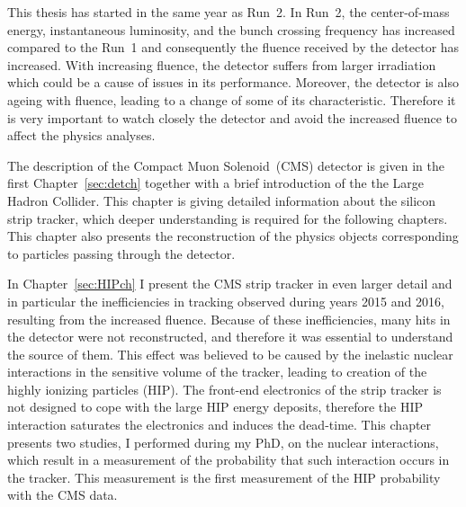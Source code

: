 

This thesis has started in the same year as Run~2. In Run~2, the center-of-mass energy, instantaneous luminosity, and the bunch crossing frequency has increased compared to the Run~1 and consequently the fluence received by the detector has increased. With increasing fluence, the detector suffers from larger irradiation which could be a cause of issues in its performance. Moreover, the detector is also ageing with fluence, leading to a change of some of its characteristic. Therefore it is very important to watch closely the detector and avoid the increased fluence to affect the physics analyses.

The description of the Compact Muon Solenoid~(CMS) detector is given in the first Chapter~\ref{sec:detch} together with a brief introduction of the the Large Hadron Collider. This chapter is giving detailed information about the silicon strip tracker, which deeper understanding is required for the following chapters. This chapter also presents the reconstruction of the physics objects corresponding to particles passing through the detector.

In Chapter~\ref{sec:HIPch} I present the CMS strip tracker in even larger detail and in particular the inefficiencies in tracking observed during years 2015 and 2016, resulting from the increased fluence. Because of these inefficiencies, many hits in the detector were not reconstructed, and therefore it was essential to understand the source of them. This effect was believed to be caused by the inelastic nuclear interactions in the sensitive volume of the tracker, leading to creation of the highly ionizing particles (HIP). The front-end electronics of the strip tracker is not designed to cope with the large HIP energy deposits, therefore the HIP interaction saturates the electronics and induces the dead-time. This chapter presents two studies, I performed during my PhD, on the  nuclear interactions, which result in a measurement of the probability that such interaction occurs in the tracker. This measurement is the first measurement of the HIP probability with the CMS data. 

